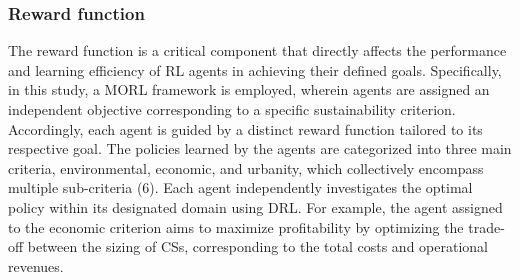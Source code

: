 \documentclass[preprint,12pt]{elsarticle}
\begin{document}
\subsubsection{Reward function}
The reward function is a critical component that directly affects the performance and learning efficiency of RL agents in achieving their defined goals. Specifically, in this study, a MORL framework is employed, wherein agents are assigned an independent objective corresponding to a specific sustainability criterion. Accordingly, each agent is guided by a distinct reward function tailored to its respective goal. The policies learned by the agents are categorized into three main criteria, environmental, economic, and urbanity, which collectively encompass multiple sub-criteria (6). Each agent independently investigates the optimal policy within its designated domain using DRL. For example, the agent assigned to the economic criterion aims to maximize profitability by optimizing the trade-off between the sizing of CSs, corresponding to the total costs and operational revenues.
\end{document}
